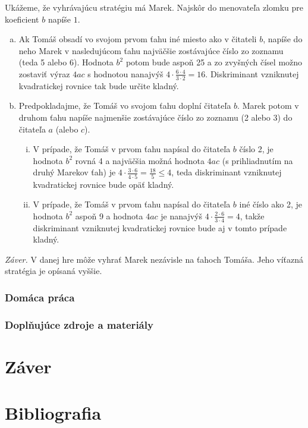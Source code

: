 \documentclass[11pt,a4paper,oneside,final]{book}
\begin{document}
Ukážeme, že vyhrávajúcu stratégiu má Marek. Najskôr do menovateľa zlomku pre koeficient $b$ napíše $1$.
\begin{enumerate}[a)]
\item Ak Tomáš obsadí vo svojom prvom ťahu iné miesto ako v čitateli $b$, napíše do neho Marek v nasledujúcom ťahu najväčšie zostávajúce číslo zo zoznamu (teda 5 alebo 6). Hodnota $b^2$ potom bude aspoň 25 a zo zvyšných čísel možno zostaviť výraz $4ac$ s hodnotou nanajvýš $4\cdot  \frac{6\cdot4}{3\cdot2}= 16$. Diskriminant vzniknutej kvadratickej rovnice tak bude určite kladný.
\item Predpokladajme, že Tomáš vo svojom ťahu doplní čitateľa $b$. Marek potom v druhom ťahu napíše najmenšie zostávajúce číslo zo zoznamu (2 alebo 3) do čitateľa $a$ (alebo $c$).
\begin{enumerate}[(i)]
\item V prípade, že Tomáš v prvom ťahu napísal do čitateľa $b$ číslo 2, je hodnota $b^2$ rovná 4 a najväčšia možná hodnota $4ac$ (s prihliadnutím na druhý Marekov ťah) je $4 \cdot \frac{3\cdot 6}{4\cdot 5}=\frac{18}{5}\leq  4$, teda diskriminant vzniknutej kvadratickej rovnice bude opäť kladný.
\item  V prípade, že Tomáš v prvom ťahu napísal do čitateľa $b$ iné číslo ako 2, je hodnota $b^2$ aspoň 9 a hodnota $4ac$ je nanajvýš $4 \cdot \frac{2\cdot 6}{3\cdot4} = 4$, takže diskriminant
vzniknutej kvadratickej rovnice bude aj v tomto prípade kladný.

\end{enumerate}
\end{enumerate}
\textit{Záver.} V danej hre môže vyhrať Marek nezávisle na ťahoch Tomáša. Jeho víťazná
stratégia je opísaná vyššie.


\subsection*{Domáca práca}

\subsection*{Doplňujúce zdroje a materiály}

\chapter*{Záver}
\label{chap:zaver}

\chapter*{Bibliografia}
\label{chap:bib}
\end{document}

